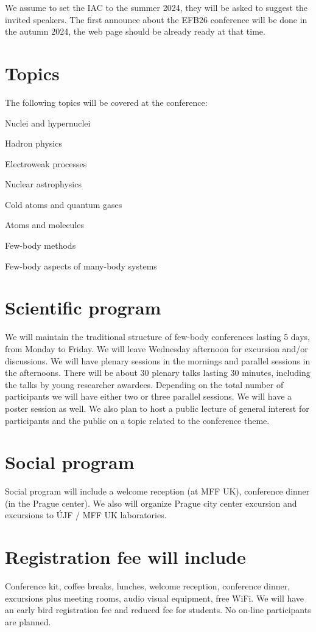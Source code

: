 \documentclass[12pt]{extarticle}
\newcommand*\sq{\mathbin{\vcenter{\hbox{\rule{.8ex}{.8ex}}}}}
\newenvironment{t_sq_itemize}
{\begin{itemize}[topsep=0pt, parsep=0pt, itemsep=0pt, leftmargin=*]
    \renewcommand{\labelitemi}{{\(\sq\)}}}
  {\end{itemize}}
\begin{document}
We assume to set the IAC to the summer 2024, they will be asked to suggest the invited speakers. 
The first announce about the EFB26 conference will be done in the autumn 2024, the web page
should be already ready at that time.

\section*{Topics}
\noindent
The following topics will be covered at the conference:
\begin{t_sq_itemize}
\item Nuclei and hypernuclei
\item Hadron physics
\item Electroweak processes
\item Nuclear astrophysics
\item Cold atoms and quantum gases
\item Atoms and molecules
\item Few-body methods
\item Few-body aspects of many-body systems
\end{t_sq_itemize}

\section*{Scientific program}
\noindent
We will maintain the traditional structure of few-body conferences lasting 5 days, from Monday
to Friday. We will leave Wednesday afternoon for excursion and/or discussions. We will have plenary sessions
in the mornings and parallel sessions in the afternoons. There will be about 30 plenary talks lasting
30 minutes, including the talks by young researcher awardees. Depending on the total number of
participants we will have either two or three parallel sessions. We will have a poster session as well.
We also plan to host a public lecture of general interest for participants and the public on a topic related
to the conference theme. 

\section*{Social program}
\noindent
Social program will include a welcome reception (at MFF UK), conference dinner (in the Prague center). 
We also will organize Prague city center excursion and excursions to ÚJF / MFF UK laboratories.

\section*{Registration fee will include}
\noindent
Conference kit, coffee breaks, lunches, welcome reception, conference dinner, excursions plus
meeting rooms,  audio visual equipment,  free WiFi. We will have an early bird registration fee and
reduced fee for students. No on-line participants are planned. 
\end{document}
